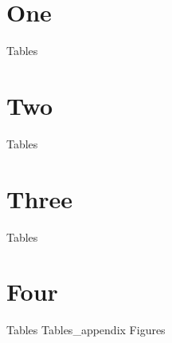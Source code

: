 \documentclass[letterpaper, 12pt, oneside]{book}
\begin{document}
\frontmatter


\setcounter{page}{2}






\tableofcontents
\listoftables
\listoffigures

\mainmatter

\chapter{One}


\clearpage
{Tables}

\chapter{Two}


\clearpage
{Tables}

\chapter{Three}


\clearpage
{Tables}

\chapter{Four}


\clearpage
{Tables}
\clearpage
{Tables_appendix}
\clearpage
{Figures}

\singlespacing


\end{document}
